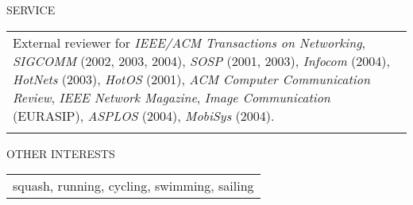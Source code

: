 \documentclass{article}
\begin{document}
\begin{flushleft}




\vspace{0.15 in}
{\ag SERVICE \hrulefill }\\
\vspace{0.1 in}
\begin{tabular}{p{7 in}}
{ External reviewer for {\em IEEE/ACM Transactions on Networking}, {\em
  SIGCOMM} 
  (2002, 2003, 2004), {\em SOSP} (2001, 2003), {\em Infocom} (2004), {\em
  HotNets} (2003), {\em HotOS} (2001), {\em  ACM Computer Communication
  Review}, {\em IEEE Network Magazine},  {\em Image Communication}
  (EURASIP), {\em ASPLOS} (2004), {\em MobiSys} (2004). } \\ \\ 

\end{tabular}


\vspace{0.2 in}
{\ag OTHER INTERESTS \hrulefill }\\
\vspace{0.1 in}
\begin{tabular}{p{7 in}}
{ squash, running, cycling, swimming, sailing  }
\end{tabular}



\end{flushleft}
\end{document}
